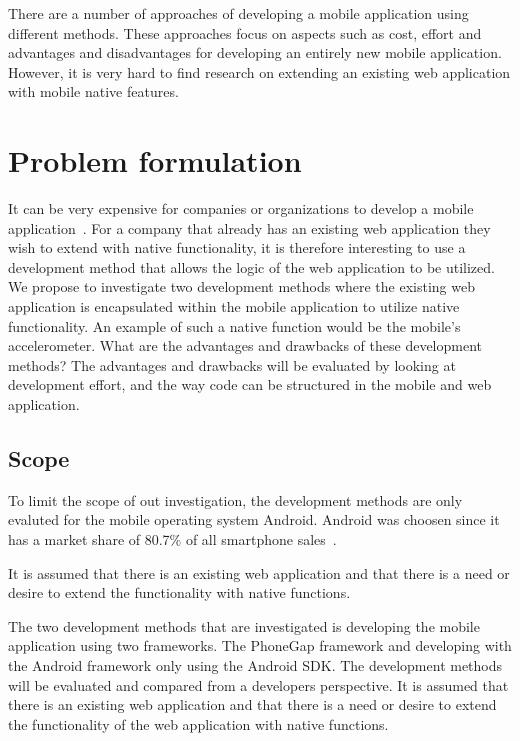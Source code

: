 There are a number of approaches of developing a mobile application using different methods. These approaches focus on aspects such as cost, effort and advantages and disadvantages for developing an entirely new mobile application. However, it is very hard to find research on extending an existing web application with mobile native features.

\section{Problem formulation}\label{sec:problem-formulation}
It can be very expensive for companies or organizations to develop a mobile application~\cite{kohan2015}. 
For a company that already has an existing web application they wish to extend with native functionality, it is therefore interesting to use a development method that allows the logic of the web application to be utilized.
\\
We propose to investigate two development methods where the existing web application is encapsulated within the mobile application to utilize native functionality. An example of such a native function would be the mobile's accelerometer. What are the advantages and drawbacks of these development methods? The advantages and drawbacks will be evaluated by looking at development effort, and the way code can be structured in the mobile and web application.

\subsection{Scope} \label{subsec:scope}
To limit the scope of out investigation, the development methods are only evaluted for the mobile operating system Android. Android was choosen since it has a market share of 80.7\% of all smartphone sales~\cite{gartner2015}.

It is assumed that there is an existing web application and that there is a need or desire to extend the functionality with native functions.

The two development methods that are investigated is developing the mobile application using two frameworks. The PhoneGap framework and developing with the Android framework only using the Android SDK. The development methods will be evaluated and compared from a developers perspective. It is assumed that there is an existing web application and that there is a need or desire to extend the functionality of the web application with native functions.

